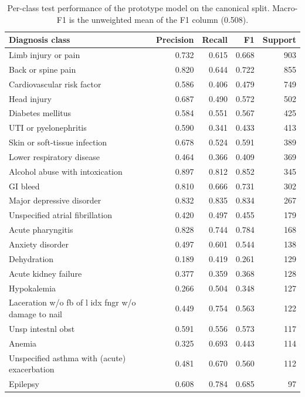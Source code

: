 \begin{table}[htbp]
  \centering
  \small
  \setlength{\tabcolsep}{4pt}
  \caption{Per-class test performance of the prototype model on the canonical
    split. Macro-F1 is the unweighted mean of the F1 column (0.508).}
  \label{tab:per-class}
  \begin{tabular}{lrrrr}
    \toprule
    Diagnosis class & Precision & Recall & F1 & Support \\
    \midrule
    Limb injury or pain & 0.732 & 0.615 & 0.668 & 903 \\
    Back or spine pain & 0.820 & 0.644 & 0.722 & 855 \\
    Cardiovascular risk factor & 0.586 & 0.406 & 0.479 & 749 \\
    Head injury & 0.687 & 0.490 & 0.572 & 502 \\
    Diabetes mellitus & 0.584 & 0.551 & 0.567 & 425 \\
    UTI or pyelonephritis & 0.590 & 0.341 & 0.433 & 413 \\
    Skin or soft-tissue infection & 0.678 & 0.524 & 0.591 & 389 \\
    Lower respiratory disease & 0.464 & 0.366 & 0.409 & 369 \\
    Alcohol abuse with intoxication & 0.897 & 0.812 & 0.852 & 345 \\
    GI bleed & 0.810 & 0.666 & 0.731 & 302 \\
    Major depressive disorder & 0.832 & 0.835 & 0.834 & 267 \\
    Unspecified atrial fibrillation & 0.420 & 0.497 & 0.455 & 179 \\
    Acute pharyngitis & 0.828 & 0.744 & 0.784 & 168 \\
    Anxiety disorder & 0.497 & 0.601 & 0.544 & 138 \\
    Dehydration & 0.189 & 0.419 & 0.261 & 129 \\
    Acute kidney failure & 0.377 & 0.359 & 0.368 & 128 \\
    Hypokalemia & 0.266 & 0.504 & 0.348 & 127 \\
    Laceration w/o fb of l idx fngr w/o damage to nail & 0.449 & 0.754 & 0.563 & 122 \\
    Unsp intestnl obst & 0.591 & 0.556 & 0.573 & 117 \\
    Anemia & 0.325 & 0.693 & 0.443 & 114 \\
    Unspecified asthma with (acute) exacerbation & 0.481 & 0.670 & 0.560 & 112 \\
    Epilepsy & 0.608 & 0.784 & 0.685 & 97 \\

\end{tabular}
\end{table}
